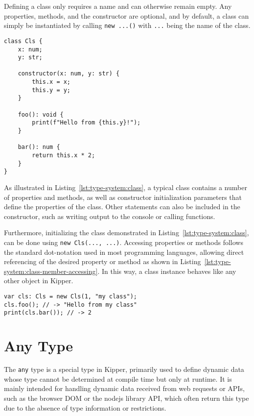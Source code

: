 Defining a class only requires a name and can otherwise remain empty. Any properties, methods, and the constructor are optional, and by default, a class can simply be instantiated by calling \lstinline|new ...()| with \lstinline|...| being the name of the class. 

\begin{lstlisting}[language=Kipper,caption=The definition of a simple class with a constructor\, methods and properties,label=lst:type-system:class]
class Cls {
	x: num;
	y: str;
	
	constructor(x: num, y: str) {
		this.x = x;
		this.y = y;
	}
	
	foo(): void {
		print(f"Hello from {this.y}!");
	}
	
	bar(): num {
		return this.x * 2;
	}
}
\end{lstlisting}

As illustrated in Listing~\ref{lst:type-system:class}, a typical class contains a number of properties and methods, as well as constructor initialization parameters that define the properties of the class. Other statements can also be included in the constructor, such as writing output to the console or calling functions.

Furthermore, initializing the class demonstrated in Listing~\ref{lst:type-system:class}, can be done using \lstinline|new Cls(..., ...)|. Accessing properties or methods follows the standard dot-notation used in most programming languages, allowing direct referencing of the desired property or method as shown in Listing~\ref{lst:type-system:class-member-accessing}. In this way, a class instance behaves like any other object in Kipper.

\begin{lstlisting}[language=Kipper,caption=Accessing the members of a Kipper class,label=lst:type-system:class-member-accessing]
var cls: Cls = new Cls(1, "my class");
cls.foo(); // -> "Hello from my class"
print(cls.bar()); // -> 2
\end{lstlisting}

\section{Any Type}
\label{sec:kipper-any}

The \lstinline|any| type is a special type in Kipper, primarily used to define dynamic data whose type cannot be determined at compile time but only at runtime. It is mainly intended for handling dynamic data received from web requests or APIs, such as the browser DOM or the \Gls{nodejs} library API, which often return this type due to the absence of type information or restrictions.

